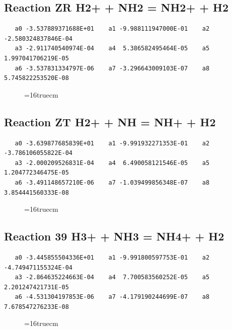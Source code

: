 \documentclass[12pt,dvipdfm]{article}
\begin{document}
\subsection{
Reaction ZR H2+ + NH2 = NH2+ + H2}
\begin{small}\begin{verbatim}
   a0 -3.537889371688E+01    a1 -9.988111947000E-01    a2 -2.580324837846E-04
   a3 -2.911740540974E-04    a4  5.386582495464E-05    a5  1.997041706219E-05
   a6 -3.537831334797E-06    a7 -3.296643009103E-07    a8  5.745822253520E-08
   \end{verbatim}\end{small}
\begin{figure}[h!]
\label{n2rates}
\epsfxsize=16truecm
\end{figure}
\newpage

\subsection{
Reaction ZT H2+ + NH = NH+ + H2}
\begin{small}\begin{verbatim}
   a0 -3.639877685839E+01    a1 -9.991932271353E-01    a2 -3.786106055822E-04
   a3 -2.000209526831E-04    a4  6.490058121546E-05    a5  1.204772346475E-05
   a6 -3.491148657210E-06    a7 -1.039499856348E-07    a8  3.854441560333E-08
   \end{verbatim}\end{small}
\begin{figure}[h!]
\label{n2rates}
\epsfxsize=16truecm
\end{figure}
\newpage

\subsection{
Reaction 39 H3+ + NH3 = NH4+ + H2}
\begin{small}\begin{verbatim}
   a0 -3.445855504336E+01    a1 -9.991800597753E-01    a2 -4.749471155324E-04
   a3 -2.864635224663E-04    a4  7.700583560252E-05    a5  2.201247421731E-05
   a6 -4.531304197853E-06    a7 -4.179190244699E-07    a8  7.678547276233E-08
   \end{verbatim}\end{small}
\begin{figure}[h!]
\label{n2rates}
\epsfxsize=16truecm
\end{figure}
\newpage
\end{document}
